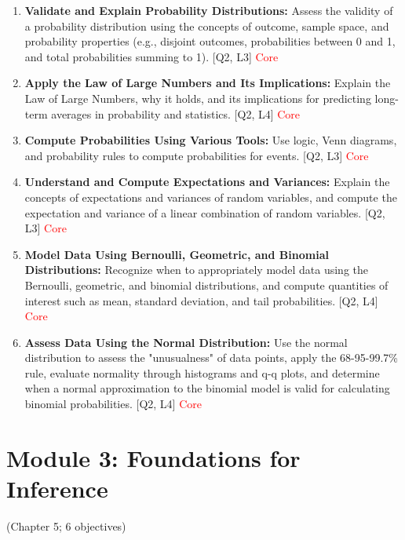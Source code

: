 \documentclass[12pt]{article}
\begin{document}
\begin{enumerate}
    \item \textbf{Validate and Explain Probability Distributions:} Assess the validity of a probability distribution using the concepts of outcome, sample space, and probability properties (e.g., disjoint outcomes, probabilities between 0 and 1, and total probabilities summing to 1). [Q2, L3]  \textcolor{red}{Core}
    \item \textbf{Apply the Law of Large Numbers and Its Implications:} Explain the Law of Large Numbers, why it holds, and its implications for predicting long-term averages in probability and statistics. [Q2, L4] \textcolor{red}{Core}
    \item \textbf{Compute Probabilities Using Various Tools:} Use logic, Venn diagrams, and probability rules to compute probabilities for events. [Q2, L3] \textcolor{red}{Core}
    \item \textbf{Understand and Compute Expectations and Variances:} Explain the concepts of expectations and variances of random variables, and compute the expectation and variance of a linear combination of random variables. [Q2, L3] \textcolor{red}{Core} 
    \item \textbf{Model Data Using Bernoulli, Geometric, and Binomial Distributions:} Recognize when to appropriately model data using the Bernoulli, geometric, and binomial distributions, and compute quantities of interest such as mean, standard deviation, and tail probabilities. [Q2, L4] \textcolor{red}{Core}
    \item \textbf{Assess Data Using the Normal Distribution:} Use the normal distribution to assess the "unusualness" of data points, apply the 68-95-99.7\% rule, evaluate normality through histograms and q-q plots, and determine when a normal approximation to the binomial model is valid for calculating binomial probabilities. [Q2, L4] \textcolor{red}{Core}
\end{enumerate}

\newpage


\section{Module 3: Foundations for Inference}
(Chapter 5; 6 objectives)

\end{document}
